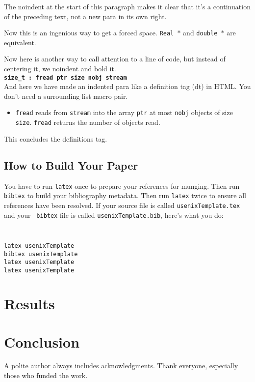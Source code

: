 \documentclass[letterpaper,twocolumn,10pt]{article}
\begin{document}
\noindent
The noindent at the start of this paragraph makes it clear that it's
a continuation of the preceding text, not a new para in its own right.


Now this is an ingenious way to get a forced space.
{\tt Real~$*$} and {\tt double~$*$} are equivalent. 

Now here is another way to call attention to a line of code, but instead
of centering it, we noindent and bold it.\\

\noindent
{\bf \tt size\_t : fread ptr size nobj stream } \\

And here we have made an indented para like a definition tag (dt)
in HTML.  You don't need a surrounding list macro pair.
\begin{itemize}
\item[]  {\tt fread} reads from {\tt stream} into the array {\tt ptr} at
most {\tt nobj} objects of size {\tt size}.   {\tt fread} returns
the number of objects read. 
\end{itemize}
This concludes the definitions tag.

\subsection{How to Build Your Paper}

You have to run {\tt latex} once to prepare your references for
munging.  Then run {\tt bibtex} to build your bibliography metadata.
Then run {\tt latex} twice to ensure all references have been resolved.
If your source file is called {\tt usenixTemplate.tex} and your {\tt
  bibtex} file is called {\tt usenixTemplate.bib}, here's what you do:
{\tt \small
\begin{verbatim}
latex usenixTemplate
bibtex usenixTemplate
latex usenixTemplate
latex usenixTemplate
\end{verbatim}
}

\section{Results}

\section{Conclusion}

A polite author always includes acknowledgments.  Thank everyone,
especially those who funded the work. 
\end{document}
